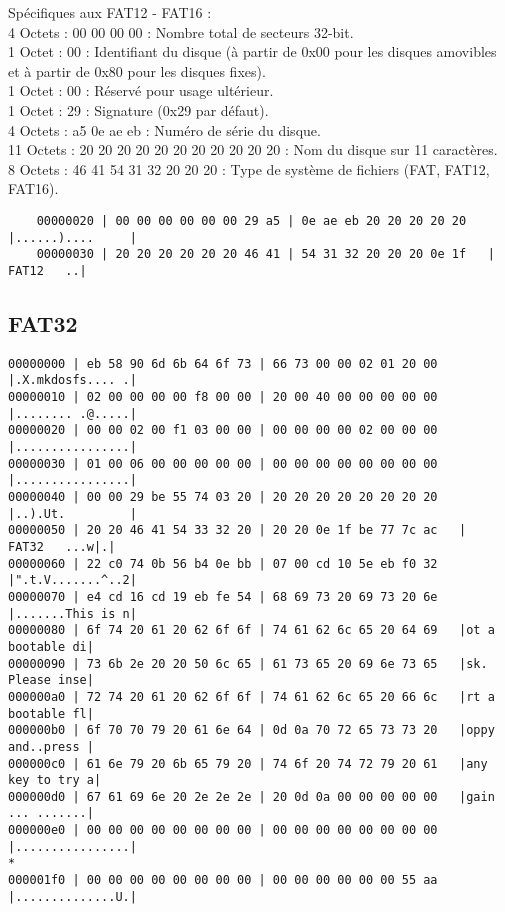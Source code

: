 \documentclass[11pt]{report}
\begin{document}
Spécifiques aux FAT12 - FAT16 : \\
4 Octets : 00 00 00 00 : Nombre total de secteurs 32-bit.\\
1 Octet : 00 : Identifiant du disque (à partir de 0x00 pour les disques amovibles et à partir de 0x80 pour les disques fixes).\\
1 Octet : 00 : Réservé pour usage ultérieur.\\
1 Octet : 29 : Signature (0x29 par défaut).\\
4 Octets : a5 0e ae eb : Numéro de série du disque.\\
11 Octets : 20 20 20 20 20 20 20 20 20 20 20 : Nom du disque sur 11 caractères.\\
8 Octets : 46 41 54 31 32 20 20 20 : Type de système de fichiers (FAT, FAT12, FAT16).
\begin{verbatim}
	00000020 | 00 00 00 00 00 00 29 a5 | 0e ae eb 20 20 20 20 20   |......)....     | 
	00000030 | 20 20 20 20 20 20 46 41 | 54 31 32 20 20 20 0e 1f   |      FAT12   ..| 
\end{verbatim}
\newpage

\subsection{FAT32}
\begin{verbatim}
00000000 | eb 58 90 6d 6b 64 6f 73 | 66 73 00 00 02 01 20 00   |.X.mkdosfs.... .|
00000010 | 02 00 00 00 00 f8 00 00 | 20 00 40 00 00 00 00 00   |........ .@.....|
00000020 | 00 00 02 00 f1 03 00 00 | 00 00 00 00 02 00 00 00   |................|
00000030 | 01 00 06 00 00 00 00 00 | 00 00 00 00 00 00 00 00   |................|
00000040 | 00 00 29 be 55 74 03 20 | 20 20 20 20 20 20 20 20   |..).Ut.         |
00000050 | 20 20 46 41 54 33 32 20 | 20 20 0e 1f be 77 7c ac   |  FAT32   ...w|.|
00000060 | 22 c0 74 0b 56 b4 0e bb | 07 00 cd 10 5e eb f0 32   |".t.V.......^..2|
00000070 | e4 cd 16 cd 19 eb fe 54 | 68 69 73 20 69 73 20 6e   |.......This is n|
00000080 | 6f 74 20 61 20 62 6f 6f | 74 61 62 6c 65 20 64 69   |ot a bootable di|
00000090 | 73 6b 2e 20 20 50 6c 65 | 61 73 65 20 69 6e 73 65   |sk.  Please inse|
000000a0 | 72 74 20 61 20 62 6f 6f | 74 61 62 6c 65 20 66 6c   |rt a bootable fl|
000000b0 | 6f 70 70 79 20 61 6e 64 | 0d 0a 70 72 65 73 73 20   |oppy and..press |
000000c0 | 61 6e 79 20 6b 65 79 20 | 74 6f 20 74 72 79 20 61   |any key to try a|
000000d0 | 67 61 69 6e 20 2e 2e 2e | 20 0d 0a 00 00 00 00 00   |gain ... .......|
000000e0 | 00 00 00 00 00 00 00 00 | 00 00 00 00 00 00 00 00   |................|
*
000001f0 | 00 00 00 00 00 00 00 00 | 00 00 00 00 00 00 55 aa   |..............U.|

\end{verbatim}
\end{document}
